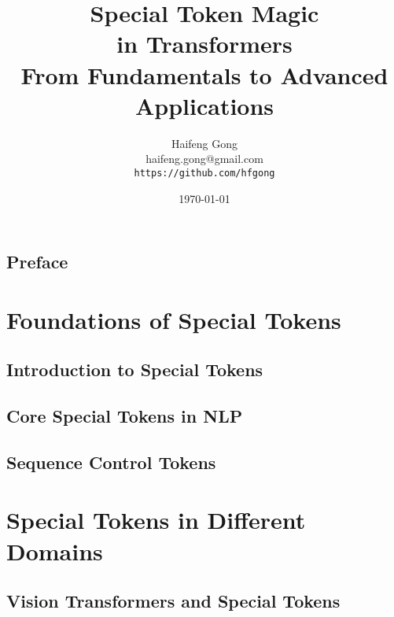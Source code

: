 \documentclass[11pt,oneside]{book}
\title{{\Huge \textbf{Special Token Magic\\in Transformers}}\\[0.5cm]
{\large From Fundamentals to Advanced Applications}}
\author{{\Large Haifeng Gong}\\[0.3cm]
{\normalsize haifeng.gong@gmail.com}\\[0.5cm]
{\tt https://github.com/hfgong}}
\date{\today}
\theoremstyle{definition}
\theoremstyle{plain}
\theoremstyle{remark}
\begin{document}
\frontmatter
\maketitle

\tableofcontents

\listoffigures

\lstlistoflistings

\chapter{Preface}


\mainmatter

\part{Foundations of Special Tokens}

\chapter{Introduction to Special Tokens}






\chapter{Core Special Tokens in NLP}





\chapter{Sequence Control Tokens}





\part{Special Tokens in Different Domains}

\chapter{Vision Transformers and Special Tokens}





\end{document}
